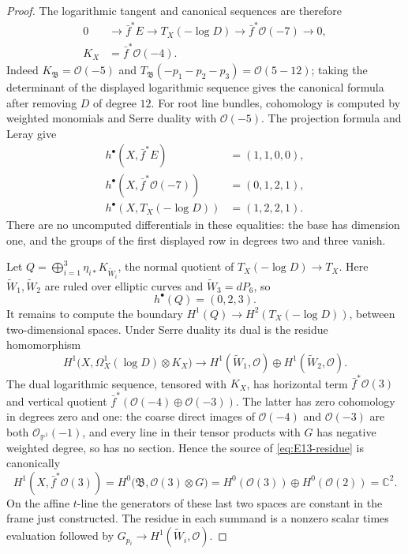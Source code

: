 \begin{proof}
The logarithmic tangent and canonical sequences are therefore
\[
\begin{split}
 0&\longrightarrow\bar f^*E\longrightarrow T_X(-\log D)
 \longrightarrow\bar f^*\mathcal O(-7)\longrightarrow0,\\
 K_X&=\bar f^*\mathcal O(-4).
\end{split}
\]
Indeed $K_{\mathfrak B}=\mathcal O(-5)$ and
$T_{\mathfrak B}(-p_1-p_2-p_3)=\mathcal O(5-12)$; taking the
determinant of the displayed logarithmic sequence gives the
canonical formula after removing $D$ of degree $12$.
For root line bundles, cohomology is computed by weighted monomials
and Serre duality with $\mathcal O(-5)$. The projection formula and
Leray give
\[
\begin{split}
 h^\bullet(X,\bar f^*E)&=(1,1,0,0),\\
 h^\bullet(X,\bar f^*\mathcal O(-7))&=(0,1,2,1),\\
 h^\bullet(X,T_X(-\log D))&=(1,2,2,1).
\end{split}
\]
There are no uncomputed differentials in these equalities: the base
has dimension one, and the groups of the first displayed row in
degrees two and three vanish.

Let $Q=\bigoplus_{i=1}^3\eta_{i*}K_{\widetilde W_i}$, the normal
quotient of $T_X(-\log D)\to T_X$. Here
$\widetilde W_1,\widetilde W_2$ are ruled over elliptic curves and
$\widetilde W_3=dP_6$, so
\[
 h^\bullet(Q)=(0,2,3).
\]
It remains to compute the boundary
$H^1(Q)\to H^2(T_X(-\log D))$, between two-dimensional spaces.
Under Serre duality its dual is the residue homomorphism
\begin{equation}\label{eq:E13-residue}
 H^1\bigl(X,\Omega_X^1(\log D)\otimes K_X\bigr)
 \longrightarrow
 H^1(\widetilde W_1,\mathcal O)\oplus
 H^1(\widetilde W_2,\mathcal O).
\end{equation}
The dual logarithmic sequence, tensored with $K_X$, has horizontal
term $\bar f^*\mathcal O(3)$ and vertical quotient
$\bar f^*(\mathcal O(-4)\oplus\mathcal O(-3))$.
The latter has zero cohomology in degrees zero and one: the coarse
direct images of $\mathcal O(-4)$ and $\mathcal O(-3)$ are both
$\mathcal O_{\mathbb P^1}(-1)$, and every line in their tensor
products with $G$ has negative weighted degree, so has no section.
Hence the
source of \eqref{eq:E13-residue} is canonically
\[
 H^1(X,\bar f^*\mathcal O(3))
 =H^0\bigl(\mathfrak B,\mathcal O(3)\otimes G\bigr)
 =H^0(\mathcal O(3))\oplus H^0(\mathcal O(2))=\mathbb C^2.
\]
On the affine $t$-line the generators of these last two spaces are
constant in the frame just constructed. The residue in each
summand is a nonzero scalar times evaluation followed by
$G_{p_i}\to H^1(\widetilde W_i,\mathcal O)$.


\end{proof}
